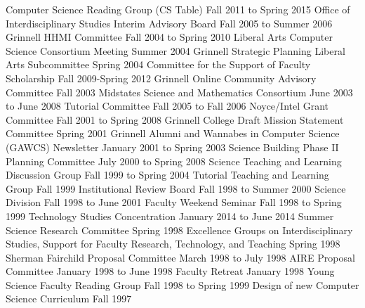 \begin{cventries}
  {Computer Science Reading Group (CS Table)}
  {Fall 2011 to Spring 2015}
  {Office of Interdisciplinary Studies Interim Advisory Board}
  {Fall 2005 to Summer 2006}
  {Grinnell HHMI Committee}
  {Fall 2004 to Spring 2010}
  {Liberal Arts Computer Science Consortium Meeting}
  {Summer 2004}
  {Grinnell Strategic Planning Liberal Arts Subcommittee}
  {Spring 2004}
  {Committee for the Support of Faculty Scholarship}
  {Fall 2009-Spring 2012}
  {Grinnell Online Community Advisory Committee}
  {Fall 2003}
  {Midstates Science and Mathematics Consortium}
  {June 2003 to June 2008}
  {Tutorial Committee}
  {Fall 2005 to Fall 2006}
  {Noyce/Intel Grant Committee}
  {Fall 2001 to Spring 2008}
  {Grinnell College Draft Mission Statement Committee}
  {Spring 2001}
  {Grinnell Alumni and Wannabes in Computer Science (GAWCS) Newsletter}
  {January 2001 to Spring 2003}
  {Science Building Phase II Planning Committee}
  {July 2000 to Spring 2008}
  {Science Teaching and Learning Discussion Group}
  {Fall 1999 to Spring 2004}
  {Tutorial Teaching and Learning Group}
  {Fall 1999}
  {Institutional Review Board}
  {Fall 1998 to Summer 2000}
  {Science Division}
  {Fall 1998 to June 2001}
  {Faculty Weekend Seminar}
  {Fall 1998 to Spring 1999}
  {Technology Studies Concentration}
  {January 2014 to June 2014}
  {Summer Science Research Committee}
  {Spring 1998}
  {Excellence Groups on Interdisciplinary Studies, Support for Faculty Research, Technology, and Teaching}
  {Spring 1998}
  {Sherman Fairchild Proposal Committee}
  {March 1998 to July 1998}
  {AIRE Proposal Committee}
  {January 1998 to June 1998}
  {Faculty Retreat}
  {January 1998}
  {Young Science Faculty Reading Group}
  {Fall 1998 to Spring 1999}
  {Design of new Computer Science Curriculum}
  {Fall 1997}

\end{cventries}
